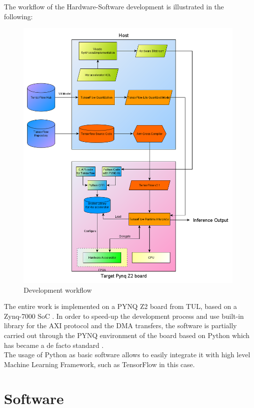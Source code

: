 \newpage
The workflow of the Hardware-Software development is illustrated in the following:
\begin{figure}[!htbp]
\centering
\captionsetup{justification=centering}
\includegraphics[scale=0.5]{./figure/workflow.png}
\caption{Development workflow}
\label{fig:workflow}
\end{figure}

\newpage
The entire work is implemented on a PYNQ Z2 board from TUL, based on a Zynq-7000 SoC \cite{paper:31}. In order to speed-up the development process and use built-in library for the AXI protocol and the DMA transfers, the software is partially carried out through the PYNQ environment of the board \cite{WEBSITE:2} based on Python which has became a de facto standard \cite{paper:37}. \\
The usage of Python as basic software allows to easily integrate it with high level Machine Learning Framework, such as TensorFlow in this case. 
\newpage
\section{Software}

